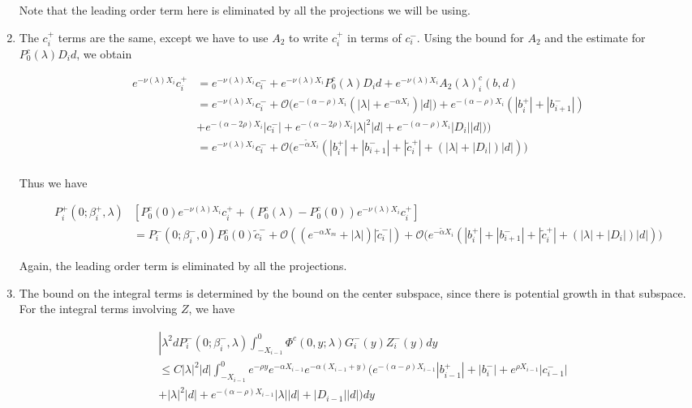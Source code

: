 \documentclass[12pt]{article}
\begin{document}
\begin{enumerate}
Note that the leading order term here is eliminated by all the projections we will be using.

\item The $c_i^+$ terms are the same, except we have to use $A_2$ to write $c_i^+$ in terms of $c_i^-$. Using the bound for $A_2$ and the estimate for $P_0^c(\lambda) D_i d$, we obtain 

\begin{align*}
e^{-\nu(\lambda)X_i} c_i^+ &= e^{-\nu(\lambda)X_i} c_i^- 
+ e^{-\nu(\lambda)X_i} P_0^c(\lambda) D_i d + e^{-\nu(\lambda)X_i} A_2(\lambda)_i^c(b, d)\\
&= e^{-\nu(\lambda)X_i} c_i^- + \mathcal{O}\Big( e^{-(\alpha - \rho) X_i} ( |\lambda| + e^{-\alpha X_i} ) |d|) + e^{-(\alpha - \rho) X_i} (|b_i^+| + |b_{i+1}^-|) \\
&+ e^{-(\alpha - 2 \rho) X_i} |c_i^-| + e^{-(\alpha - 2 \rho) X_i} |\lambda|^2|d| + e^{-(\alpha - \rho) X_i} |D_i||d| ) \Big) \\
&= e^{-\nu(\lambda)X_i} c_i^- + \mathcal{O}\Big( e^{-\tilde{\alpha} X_i} ( |b_i^+| + |b_{i+1}^-| + |\tilde{c}_i^+| + (|\lambda| + |D_i| ) |d|) \Big) \\
\end{align*}

Thus we have

\begin{align*}
P_i^+(0; \beta_i^+, \lambda)&[ P_0^c(0) e^{-\nu(\lambda) X_i} c_i^+ + (P_0^c(\lambda) - P_0^c(0)) e^{-\nu(\lambda) X_i} c_i^+] \\
&= P_i^-(0; \beta_i^-, 0) P_0^c(0) \tilde{c}_i^- + \mathcal{O}((e^{-\alpha X_m} + |\lambda|)|\tilde{c}_i^-|)
+ \mathcal{O}\Big( e^{-\tilde{\alpha} X_i} ( |b_i^+| + |b_{i+1}^-| + |\tilde{c}_i^+| + (|\lambda| + |D_i| ) |d|) \Big)
\end{align*}

Again, the leading order term is eliminated by all the projections.

\item The bound on the integral terms is determined by the bound on the center subspace, since there is potential growth in that subspace. For the integral terms involving $Z$, we have

\begin{align*}
&\left| \lambda^2 d P_i^-(0; \beta_i^-, \lambda) \int_{-X_{i-1}}^0 \Phi^c(0, y; \lambda) G_i^-(y) Z_i^-(y) dy \\
&\leq C |\lambda|^2 |d| \int_{-X_{i-1}}^0 e^{-\rho y} e^{-\alpha X_{i-1}} e^{-\alpha(X_{i-1} + y) } ( e^{-(\alpha - \rho) X_{i-1}} |b_{i-1}^+| + |b_i^-| + e^{\rho X_{i-1}}|c_{i-1}^-| \\
&+ |\lambda|^2 |d| + e^{-(\alpha - \rho)X_{i-1}}|\lambda||d| + |D_{i-1}||d| ) dy
\end{align*}


\end{enumerate}
\end{document}
